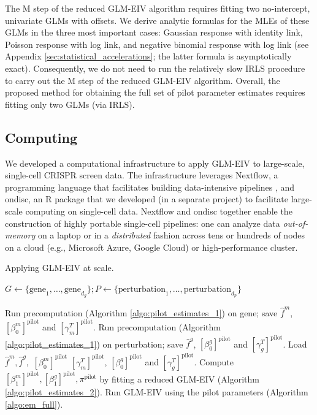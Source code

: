 \documentclass[12pt]{article}
\begin{document}
The M step of the reduced GLM-EIV algorithm requires fitting two no-intercept, univariate GLMs with offsets. We derive analytic formulas for the MLEs of these GLMs in the three most important cases: Gaussian response with identity link, Poisson response with log link, and negative binomial response with log link (see Appendix \ref{sec:statistical_accelerations}; the latter formula is asymptotically exact). Consequently, we do not need to run the relatively slow IRLS procedure to carry out the M step of the reduced GLM-EIV algorithm. Overall, the proposed method for obtaining the full set of pilot parameter estimates requires fitting only two GLMs (via IRLS).

\subsection{Computing}\label{sec:computing}

We developed a computational infrastructure to apply GLM-EIV to large-scale, single-cell CRISPR screen data. The infrastructure leverages Nextflow, a programming language that facilitates building data-intensive pipelines \cite{DITommaso2017}, and ondisc, an R package that we developed (in a separate project) to facilitate large-scale computing on single-cell data. Nextflow and ondisc together enable the construction of highly portable single-cell pipelines: one can analyze data \textit{out-of-memory} on a laptop or in a \textit{distributed} fashion across tens or hundreds of nodes on a cloud (e.g., Microsoft Azure, Google Cloud) or high-performance cluster.

\begin{algorithm}
	\caption{Applying GLM-EIV at scale.}\label{algo:at_scale}
	\begin{algorithmic}
		\State $G \gets \{\textrm{gene}_1, \dots, \textrm{gene}_{d_g}\}; P \gets \{\textrm{perturbation}_1, \dots, \textrm{perturbation}_{d_p}\}$
		
		\State Run precomputation (Algorithm \ref{algo:pilot_estimates_1}) on gene; save $\hat{f}^m$, $[\beta^m_0]^\textrm{pilot}$ and $[\gamma^T_m]^\textrm{pilot}$.
		\EndFor
		\State Run precomputation  (Algorithm \ref{algo:pilot_estimates_1}) on perturbation; save $\hat{f}^g$, $[\beta^g_0]^\textrm{pilot}$ and $[\gamma^T_g]^\textrm{pilot}$.
		\EndFor
		\State Load $\hat{f}^m, \hat{f}^g,$ $[\beta^m_0]^\textrm{pilot}$ $[\gamma^T_m]^\textrm{pilot}$, $[\beta^g_0]^\textrm{pilot}$ and $[\gamma^T_g]^\textrm{pilot}$.
		\State Compute $[\beta^m_1]^\textrm{pilot}, [\beta^g_1]^\textrm{pilot}, \pi^\textrm{pilot}$ by fitting a reduced GLM-EIV (Algorithm \ref{algo:pilot_estimates_2}).
		\State Run GLM-EIV using the pilot parameters (Algorithm \ref{algo:em_full}).
		\EndFor
	\end{algorithmic}
\end{algorithm}
\end{document}

